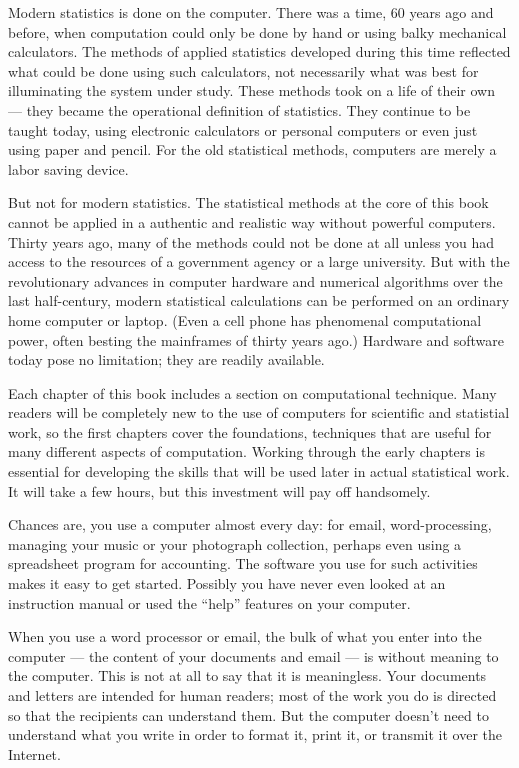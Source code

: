 
Modern statistics is done on the computer.  There was a time, 60 years
ago and before, when computation could only be done by hand or using
balky mechanical calculators.  The methods of applied statistics
developed during this time reflected what could be done using such
calculators, not necessarily what was best for illuminating the
system under study.  These methods took on a life of their own ---
they became the operational definition of statistics.  They continue
to be taught today, using electronic calculators or personal
computers or even just using paper and pencil.  For the old
statistical methods, computers are merely a labor saving device.

But not for modern statistics.  The statistical methods at the core of
this book cannot be applied in a authentic and realistic way without
powerful computers.  Thirty years ago, many of the methods 
could not be done at all
unless you had access to the resources of a government agency or a
large university.  But with the revolutionary advances in computer
hardware and numerical algorithms over the last half-century, modern
statistical calculations can be performed on an ordinary home computer
or laptop. (Even a cell phone has phenomenal computational power,
often besting the mainframes of thirty years ago.)
Hardware and software today pose no limitation; they are readily
available.  

Each chapter of this book includes a section on computational
technique.  Many readers will be completely new to the use of
computers for scientific and statistial work, so the first chapters
cover the foundations, techniques that are useful for many different
aspects of computation.  Working through the early chapters is essential
for developing the skills that will be used later in actual
statistical work.  It will take a few hours, but this investment will
pay off handsomely.

Chances are, you use a computer almost every day: for email,
word-processing, managing your music or your photograph collection, 
perhaps even using a spreadsheet program for accounting. The software
you use for such activities makes it easy to get started.  Possibly
you have never even looked at an instruction manual or used the ``help''
features on your computer. 

When you use a word processor or email, the bulk of what you enter
into the computer --- the content of your documents and email --- is
without meaning to the computer.  This is not at all to say that it is
meaningless.  Your documents and letters are intended for human
readers; most of the work you do is directed so that the recipients
can understand them.  But the computer doesn't need to understand what
you write in order to format it, print it, or transmit it over the
Internet.  

